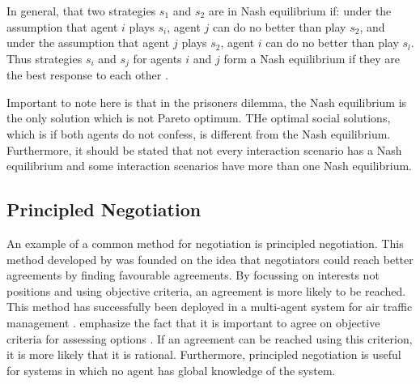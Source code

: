 In general, that two strategies $s_1$ and $s_2$ are in Nash equilibrium if: under the assumption that agent $i$ plays $s_i$, agent $j$ can do no better than play $s_2$, and under the assumption that agent $j$ plays $s_2$, agent $i$ can do no better than play $s_l$. Thus strategies $s_i$ and $s_j$ for agents $i$ and $j$ form a Nash equilibrium if they are the best response to each other  \citep{wooldridge2009introduction}. 

Important to note here is that in the prisoners dilemma, the Nash equilibrium is the only solution which is not Pareto optimum.  THe optimal social solutions, which is if both agents do not confess, is different from the Nash equilibrium.  Furthermore, it should be stated that not every interaction scenario has a Nash equilibrium and some interaction scenarios have more than one Nash equilibrium. 
\subsection{Principled Negotiation}
\label{sec:principlednegotiation}
An example of a common method for negotiation is principled negotiation. This method developed by \citet{fisher1987getting} was founded on the idea that negotiators could reach better agreements by finding favourable agreements. By focussing on interests not positions and using objective criteria, an agreement is more likely to be reached. This method has successfully been deployed in a multi-agent system for air traffic management \citep{wangermann1998principled}. \citet{fisher1987getting} emphasize the fact that it is important to agree on objective criteria for assessing options \citep{fisher1987getting}. If an agreement can be reached using this criterion, it is more likely that it is rational. Furthermore, principled negotiation is useful for systems in which no agent has global knowledge of the system.








